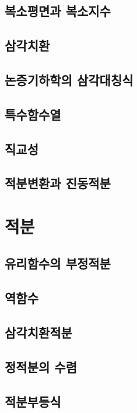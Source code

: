 \documentclass[11pt]{amsbook}
\makeatletter
\newcommand{\+}{\begin{center}$\cdot\qquad\cdot\qquad\cdot\qquad\cdot\qquad\cdot$\end{center}}
\let\@@section\section
\renewcommand{\section}{\newpage\@@section}
\makeatother
\begin{document}
\section{복소평면과 복소지수}

\section{삼각치환}

\section{논증기하학의 삼각대칭식}

\section{특수함수열}

\section{직교성}

\section{적분변환과 진동적분}











\chapter{적분}

\section{유리함수의 부정적분}

\section{역함수}

\section{삼각치환적분}

\section{정적분의 수렴}

\section{적분부등식}
\end{document}

